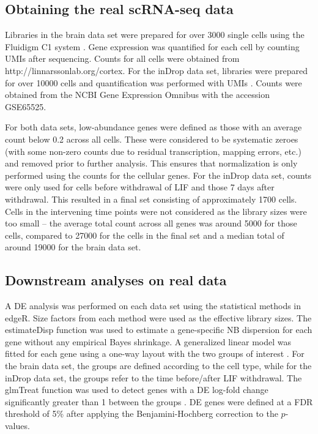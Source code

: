 \documentclass{bmcart}
\begin{document}
\subsection*{Obtaining the real scRNA-seq data}
Libraries in the brain data set were prepared for over 3000 single cells using the Fluidigm C1 system \cite{zeisel2015brain}.
Gene expression was quantified for each cell by counting UMIs after sequencing.
Counts for all cells were obtained from {http://linnarssonlab.org/cortex}.
For the inDrop data set, libraries were prepared for over 10000 cells and quantification was performed with UMIs \cite{klein2015droplet}.
Counts were obtained from the NCBI Gene Expression Omnibus with the accession GSE65525.

For both data sets, low-abundance genes were defined as those with an average count below 0.2 across all cells.
These were considered to be systematic zeroes (with some non-zero counts due to residual transcription, mapping errors, etc.) and removed prior to further analysis.
This ensures that normalization is only performed using the counts for the cellular genes.
For the inDrop data set, counts were only used for cells before withdrawal of LIF and those 7 days after withdrawal.
This resulted in a final set consisting of approximately 1700 cells.
Cells in the intervening time points were not considered as the library sizes were too small -- the average total count across all genes was around 5000 for those cells,
    compared to 27000 for the cells in the final set and a median total of around 19000 for the brain data set.

\subsection*{Downstream analyses on real data}
A DE analysis was performed on each data set using the statistical methods in edgeR.
Size factors from each method were used as the effective library sizes.
The estimateDisp function was used to estimate a gene-specific NB dispersion for each gene \cite{chen2014differential} without any empirical Bayes shrinkage.
A generalized linear model was fitted for each gene using a one-way layout with the two groups of interest \cite{mccarthy2012differential}.
For the brain data set, the groups are defined according to the cell type, while for the inDrop data set, the groups refer to the time before/after LIF withdrawal.
The glmTreat function was used to detect genes with a DE log-fold change significantly greater than 1 between the groups \cite{mccarthy2009testing}.
DE genes were defined at a FDR threshold of 5\% after applying the Benjamini-Hochberg correction to the $p$-values.
\end{document}
